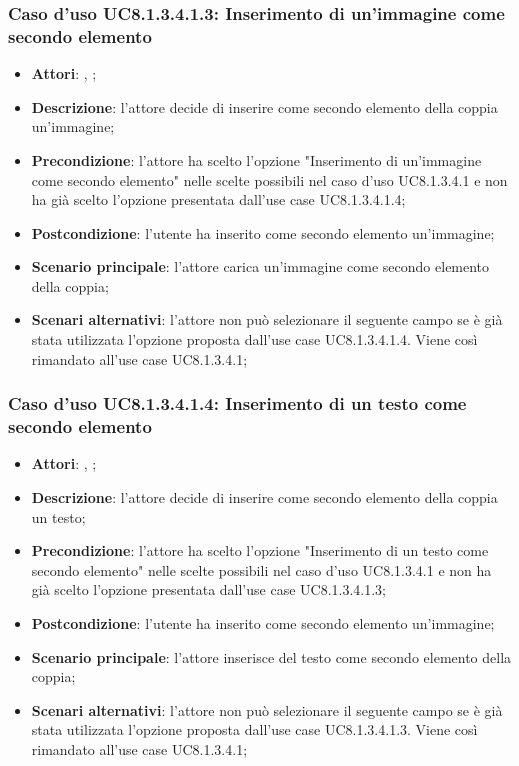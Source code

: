 			\subsubsection{Caso d'uso UC8.1.3.4.1.3: Inserimento di un'immagine come secondo elemento}
		\label{UC8.1.3.4.1.3}
		\begin{itemize}
			\item \textbf{Attori}: \uau, \uaupro;
			\item \textbf{Descrizione}: l'attore decide di inserire come secondo elemento della coppia un'immagine;
			\item \textbf{Precondizione}: l'attore ha scelto l'opzione "Inserimento di un'immagine come secondo elemento" nelle scelte possibili nel caso d'uso UC8.1.3.4.1 e non ha già scelto l'opzione presentata dall'use case UC8.1.3.4.1.4;
			\item \textbf{Postcondizione}: l'utente ha inserito come secondo elemento un'immagine;
			\item \textbf{Scenario principale}: l'attore carica un'immagine come secondo elemento della coppia;  
			\item \textbf{Scenari alternativi}: l'attore non può selezionare il seguente campo se è già stata utilizzata l'opzione proposta dall'use case UC8.1.3.4.1.4. Viene così rimandato all'use case UC8.1.3.4.1;
		\end{itemize}
		
		\subsubsection{Caso d'uso UC8.1.3.4.1.4: Inserimento di un testo come secondo elemento}
		\label{UC8.1.3.4.1.4}
		\begin{itemize}
			\item \textbf{Attori}: \uau, \uaupro;
			\item \textbf{Descrizione}: l'attore decide di inserire come secondo elemento della coppia un testo;
			\item \textbf{Precondizione}: l'attore ha scelto l'opzione "Inserimento di un testo come secondo elemento" nelle scelte possibili nel caso d'uso UC8.1.3.4.1 e non ha già scelto l'opzione presentata dall'use case UC8.1.3.4.1.3;
			\item \textbf{Postcondizione}: l'utente ha inserito come secondo elemento un'immagine;
			\item \textbf{Scenario principale}: l'attore inserisce del testo come secondo elemento della coppia;  
			\item \textbf{Scenari alternativi}: l'attore non può selezionare il seguente campo se è già stata utilizzata l'opzione proposta dall'use case UC8.1.3.4.1.3. Viene così rimandato all'use case UC8.1.3.4.1;
		\end{itemize}
	
